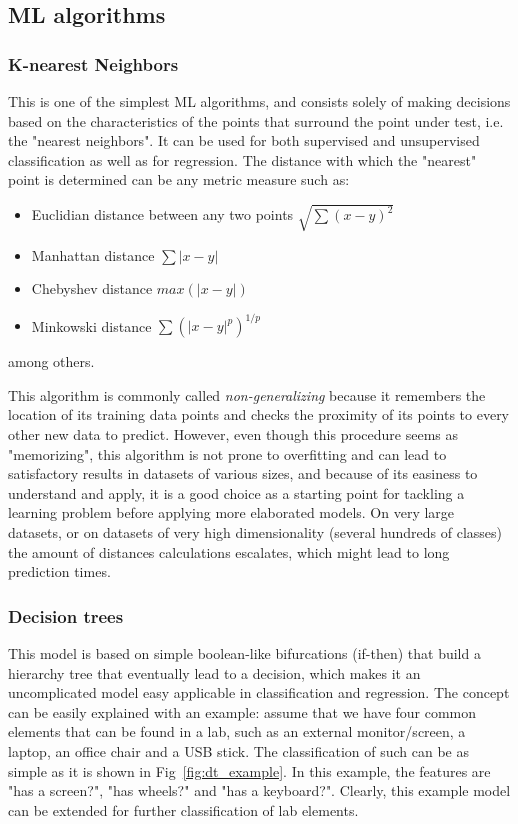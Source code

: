 \subsection{\ac{ML} algorithms}\label{ch:ml_algs}
\subsubsection{K-nearest Neighbors}
This is one of the simplest \ac{ML} algorithms, and consists solely of making decisions based on the characteristics of the points that surround the point under test, i.e. the "nearest neighbors". It can be used for both supervised and unsupervised classification as well as for regression. The distance with which the "nearest" point is determined can be any metric measure such as:
\begin{itemize}
    \item Euclidian distance between any two points \( \sqrt{\sum (x - y)^2} \)
    \item Manhattan distance \( \sum {|x - y|} \)
    \item Chebyshev distance \( max(|x - y|) \)
    \item Minkowski distance \( \sum(|x - y|^p)^{1/p} \)
\end{itemize}
among others.

This algorithm is commonly called \emph{non-generalizing} because it remembers the location of its training data points and checks the proximity of its points to every other new data to predict. However, even though this procedure seems as "memorizing", this algorithm is not prone to overfitting and can lead to satisfactory results in datasets of various sizes, and because of its easiness to understand and apply, it is a good choice as a starting point for tackling a learning problem before applying more elaborated models. On very large datasets, or on datasets of very high dimensionality (several hundreds of classes) the amount of distances calculations escalates, which might lead to long prediction times.

\subsubsection{Decision trees}
This model is based on simple boolean-like bifurcations (if-then) that build a hierarchy tree that eventually lead to a decision, which makes it an uncomplicated model easy applicable in classification and regression. The concept can be easily explained with an example: assume that we have four common elements that can be found in a lab, such as an external monitor/screen, a laptop, an office chair and a USB stick. The classification of such can be as simple as it is shown in Fig~\ref{fig:dt_example}. In this example, the features are "has a screen?", "has wheels?" and "has a keyboard?". Clearly, this example model can be extended for further classification of lab elements.

